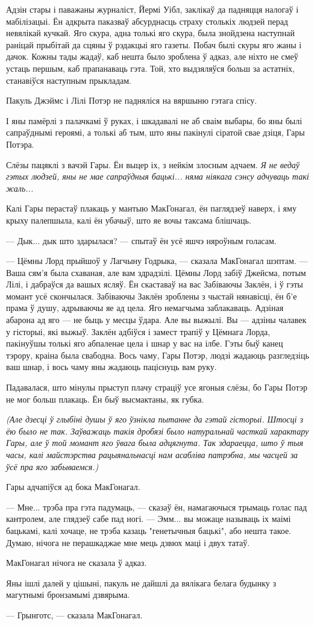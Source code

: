 Адзін стары і паважаны журналіст, Йермі Уібл, заклікаў да падняцця налогаў і мабілізацыі. Ён 
адкрыта паказваў абсурднасць страху столькіх людзей перад невялікай кучкай. Яго скура, адна толькі 
яго скура, была знойдзена наступнай раніцай прыбітай да сцяны ў рэдакцыі яго газеты. Побач былі
скуры яго жаны і дачок. Кожны тады жадаў, каб нешта было зроблена ў адказ, але ніхто не смеў
устаць першым, каб прапанаваць гэта. Той, хто выдзяляўся больш за астатніх, станавіўся
наступным прыкладам.

Пакуль Джэймс і Лілі Потэр не падняліся на вяршыню гэтага спісу.

І яны памёрлі з палачкамі ў руках, і шкадавалі не аб сваім выбары, бо яны былі сапраўднымі героямі, 
а толькі аб тым, што яны пакінулі сіратой свае дзіця, Гары Потэра.

Слёзы пацяклі з вачэй Гары. Ён выцер іх, з нейкім злосным адчаем. \emph{Я не ведаў гэтых 
людзей, яны не мае сапраўдныя бацькі... няма ніякага сэнсу адчуваць такі жаль...}

Калі Гары перастаў плакаць у мантыю МакГонагал, ён паглядзеў наверх, і яму крыху палепшыла,
калі ён убачыў, што яе вочы таксама блішчаць.

--- Дык... дык што здарылася? --- спытаў ён усё яшчэ няроўным голасам.

--- Цёмны Лорд прыйшоў у Лагчыну Годрыка, --- сказала МакГонагал шэптам. --- Ваша сям'я была
схаваная, але вам здрадзілі. Цёмны Лорд забіў Джейсма, потым Лілі, і дабраўся да вашых
ясляў. Ён скаставаў на вас Забіваючы Заклён, і ў гэты момант усё скончылася. Забіваючы Заклён
зроблены з чыстай нянавісці, ён б'е прама ў душу, адрываючы яе ад цела. Яго немагчыма 
заблакаваць. Адзіная абарона ад яго --- не быць у месцы ўдара. Але вы выжылі. Вы --- адзіны
чалавек у гісторыі, які выжыў. Заклён адбіўся і замест трапіў у Цёмнага Лорда, пакінуўшы толькі 
яго абпаленае цела і шнар у вас на ілбе. Гэты быў канец тэрору, краіна была свабодна. Вось чаму,
Гары Потэр, людзі жадаюць разгледзіць ваш шнар, і вось чаму яны жадаюць паціснуць вам руку.

Падавалася, што мінулы прыступ плачу страціў усе ягоныя слёзы, бо Гары Потэр не мог больш плакаць.
Ён быў высмактаны, як губка.

\emph{(Але дзесці ў глыбіні душы ў яго ўзнікла пытанне да гэтай гісторыі. Штосці з ёю было не так.
Заўважаць такія дробязі было натуральнай часткай характару Гары, але ў той момант яго ўвага была
адцягнута. Так здараецца, што ў тыя часы, калі майстэрства рацыянальнасці нам асабліва патрэбна,
мы часцей за ўсё пра яго забываемся.)}

Гары адчапіўся ад бока МакГонагал. 

--- Мне... трэба пра гэта падумаць, --- сказаў ён, намагаючыся трымаць голас пад кантролем, але
глядзеў сабе пад ногі. --- Эмм...  вы можаце называць іх маімі бацькамі, калі хочаце, не трэба
казаць "генетычныя бацькі", або нешта такое. Думаю, нічога не перашкаджае мне мець дзвюх маці і 
двух татаў.

МакГонагал нічога не сказала ў адказ.

Яны ішлі далей у цішыні, пакуль не дайшлі да вялікага белага будынку з магутнымі бронзамымі
дзвярыма.

--- Грынготс, --- сказала МакГонагал.
